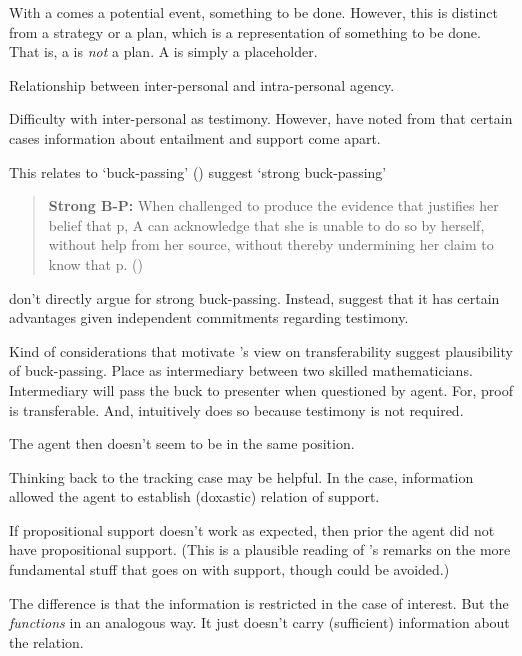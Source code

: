 \begin{note}
  With a \future{} comes a potential event, something to be done.
  However, this is distinct from a strategy or a plan, which is a representation of something to be done.
  That is, a \future{} is \emph{not} a plan.
  A \future{} is simply a placeholder.
\end{note}

\begin{note}
  Relationship between inter-personal and intra-personal agency.

  Difficulty with inter-personal as testimony.
  However, have noted from \citeauthor{Easwaran:2009tm} that certain cases information about entailment and support come apart.

  This relates to `buck-passing' (\citeyear{Baker:2018aa})
  \textcite{Baker:2018aa} suggest `strong buck-passing'

  \begin{quote}
    \textbf{Strong B-P:} When challenged to produce the evidence that justifies her belief that p, A can acknowledge that she is unable to do so by herself, without help from her source, without thereby undermining her claim to know that p.\nolinebreak
    \mbox{}\hfill\mbox{(\citeyear[8]{Baker:2018aa})}
  \end{quote}
  \citeauthor{Baker:2018aa} don't directly argue for strong buck-passing.
  Instead, suggest that it has certain advantages given independent commitments regarding testimony.

  Kind of considerations that motivate \citeauthor{Easwaran:2009tm}'s view on transferability suggest plausibility of buck-passing.
  Place as intermediary between two skilled mathematicians.
  Intermediary will pass the buck to presenter when questioned by agent.
  For, proof is transferable.
  And, intuitively does so because testimony is not required.

  The agent then doesn't seem to be in the same position.
\end{note}

\begin{note}
  Thinking back to the tracking case may be helpful.
  In the case, information allowed the agent to establish (doxastic) relation of support.

  If propositional support doesn't work as expected, then prior the agent did not have propositional support.
  (This is a plausible reading of \citeauthor{Turri:2010aa}'s remarks on the more fundamental stuff that goes on with support, though could be avoided.)

  The difference is that the information is restricted in the case of interest.
  But the \future{} \emph{functions} in an analogous way.
  It just doesn't carry (sufficient) information about the relation.
\end{note}


